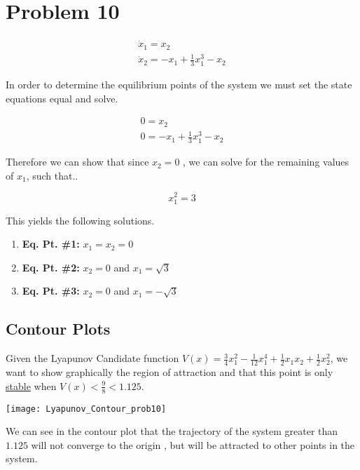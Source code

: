 \section*{Problem 10}


$$
\begin{array}{l}
\dot{x}_{1}=x_{2} \\
\dot{x}_{2}=-x_{1}+\frac{1}{3} x_{1}^{3}-x_{2}
\end{array}
$$


In order to determine the equilibrium points of the system we must set the state equations equal and solve.

$$
\begin{array}{l}
0=x_{2} \\
0=-x_{1}+\frac{1}{3} x_{1}^{3}-x_{2}
\end{array}
$$


\noindent Therefore we can show that since $x_2 =0$ , we can solve for the remaining values of $x_1$, such that..

$$
x_1^2 = 3
$$

\noindent This yields the following solutions.

\begin{enumerate}
  \item \textbf{Eq. Pt. \#1:} $x_1=x_2 =0$
  \item \textbf{Eq. Pt. \#2:} $x_2=0$ and $x_1 = \sqrt{3}$
  \item \textbf{Eq. Pt. \#3:}  $x_2=0$ and $x_1 = -\sqrt{3}$

\end{enumerate}


\subsection*{Contour Plots }

Given the Lyapunov Candidate function $V(x)=\frac{3}{4} x_{1}^{2}-\frac{1}{12} x_{1}^{4}+\frac{1}{2} x_{1} x_{2}+\frac{1}{2} x_{2}^{2}$, we want to show graphically the region of attraction and that this point is only \underline{stable} when $V(x)< \frac{9}{8} < 1.125$.


\begin{center}
  \texttt{[image: Lyapunov\_Contour\_prob10]}
\end{center}


\noindent We can see in the contour plot that the trajectory of the system greater than $1.125$ will not converge to the origin , but will be attracted to other points in the system.
